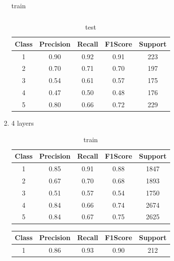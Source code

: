 \begin{enumerate}[label=(\alph*)]
\begin{enumerate}[label=\roman*.]
\begin{table}[!htb]
\begin{tabular}{ccccc}
            \end{tabular}
            \caption{train}
            \label{part c train depth 3}
        \end{table}
        \begin{table}[!htb]
            \centering
            \begin{tabular}{ccccc}
            \hline
            Class & Precision & Recall & F1Score & Support \\ \hline
            1     & 0.90      & 0.92   & 0.91    & 223     \\
            2     & 0.70      & 0.71   & 0.70    & 197     \\
            3     & 0.54      & 0.61   & 0.57    & 175     \\
            4     & 0.47      & 0.50   & 0.48    & 176     \\
            5     & 0.80      & 0.66   & 0.72    & 229     \\ \hline
            \end{tabular}
            \caption{test}
            \label{part c test depth 3}
        \end{table}
        \item 4 layers
        \begin{table}[!htb]
            \centering
            \begin{tabular}{ccccc}
            \hline
            Class & Precision & Recall & F1Score & Support \\ \hline
            1     & 0.85      & 0.91   & 0.88    & 1847    \\
            2     & 0.67      & 0.70   & 0.68    & 1893    \\
            3     & 0.51      & 0.57   & 0.54    & 1750    \\
            4     & 0.84      & 0.66   & 0.74    & 2674    \\
            5     & 0.84      & 0.67   & 0.75    & 2625    \\ \hline
            \end{tabular}
            \caption{train}
            \label{part c train depth 4}
            \end{table}
        \begin{table}[!htb]
            \centering
            \begin{tabular}{ccccc}
            \hline
            Class & Precision & Recall & F1Score & Support \\ \hline
            1     & 0.86      & 0.93   & 0.90    & 212     \\

\end{tabular}
\end{table}
\end{enumerate}
\end{enumerate}
